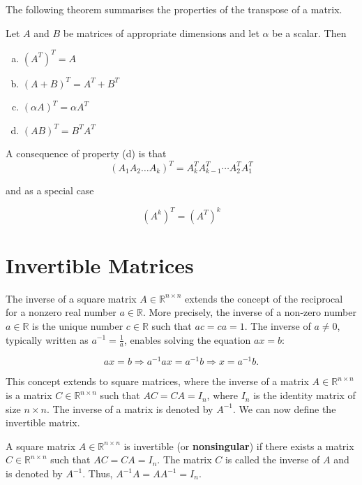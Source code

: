The following theorem summarises the properties of the transpose of a matrix.

\begin{theorem}
    Let $A$ and $B$ be matrices of appropriate dimensions and let $\alpha$ be a scalar. Then
    \begin{enumerate}[(a)]
        \item $(A^T)^T = A$
        \item $(A + B)^T = A^T + B^T$
        \item $(\alpha A)^T = \alpha A^T$
        \item $(AB)^T = B^T A^T$
    \end{enumerate}
\end{theorem}

A consequence of property (d) is that
\[
\left(A_1 A_2 \ldots A_k\right)^T=A_k^T A_{k-1}^T \cdots A_2^T A_1^T
\]

and as a special case

\[
\left(A^k\right)^T=\left(A^T\right)^k
\]

\section{Invertible Matrices}
The inverse of a square matrix \( A \in \mathbb{R}^{n \times n} \) extends the concept of the reciprocal for a nonzero real number \( a \in \mathbb{R} \). More precisely, the inverse of a non-zero number \( a \in \mathbb{R} \) is the unique number \( c \in \mathbb{R} \) such that \( a c = c a = 1 \). The inverse of \( a \neq 0 \), typically written as \( a^{-1} = \frac{1}{a} \), enables solving the equation \( a x = b \):

\[
a x = b \Rightarrow a^{-1} a x = a^{-1} b \Rightarrow x = a^{-1} b.
\]

This concept extends to square matrices, where the inverse of a matrix \( A \in \mathbb{R}^{n \times n} \) is a matrix \( C \in \mathbb{R}^{n \times n} \) such that \( A C = C A = I_n \), where \( I_n \) is the identity matrix of size \( n \times n \). The inverse of a matrix is denoted by \( A^{-1} \). We can now define the invertible matrix.

\begin{definition}
    A square matrix \( A \in \mathbb{R}^{n \times n} \) is invertible (or \textbf{nonsingular}) if there exists a matrix \( C \in \mathbb{R}^{n \times n} \) such that \( A C = C A = I_n \). The matrix \( C \) is called the inverse of \( A \) and is denoted by \( A^{-1} \). Thus, \( A^{-1} A = A A^{-1} = I_n \).
\end{definition}

